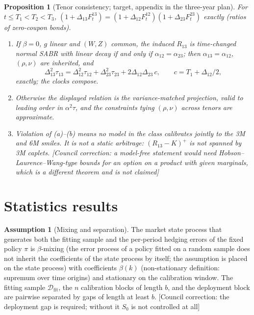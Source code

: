 \documentclass[11pt,a4paper]{article}
\newcommand{\corr}[1]{{\color{ox}\textsf{\small [Council correction: #1]}}}
\newcommand{\target}{{\color{teal}\textsf{\small target}}}
\theoremstyle{plain}
\newtheorem{proposition}[theorem]{Proposition}
\theoremstyle{definition}
\newtheorem{assumption}{Assumption}
\theoremstyle{remark}
\begin{document}
\begin{proposition}[Tenor consistency; \target, appendix in the three-year plan]\label{prop:tenor}
For $t\le T_1<T_2<T_3$, $(1+\Delta_{13}F^{13}_t)=(1+\Delta_{12}F^{12}_t)(1+\Delta_{23}F^{23}_t)$ exactly (ratios of zero-coupon bonds).
\begin{enumerate}[nosep,label=(\alph*)]
\item If $\beta=0$, $g$ linear and $(W,Z)$ common, the induced $R_{13}$ is time-changed normal SABR with linear decay if and only if $\alpha_{12}=\alpha_{23}$; then $\alpha_{13}=\alpha_{12}$, $(\rho,\nu)$ are inherited, and
\[
\Delta_{13}^2\tau_{13}=\Delta_{12}^2\tau_{12}+\Delta_{23}^2\tau_{23}+2\Delta_{12}\Delta_{23}\,c,\qquad c=T_1+\Delta_{12}/2,
\]
exactly; the clocks compose.
\item Otherwise the displayed relation is the variance-matched projection, valid to leading order in $\alpha^2\tau$, and the constraints tying $(\rho,\nu)$ across tenors are approximate.
\item Violation of (a)--(b) means no model in the class calibrates jointly to the 3M and 6M smiles. It is \emph{not} a static arbitrage: $(R_{13}-K)^+$ is not spanned by 3M caplets. \corr{a model-free statement would need Hobson--Laurence--Wang-type bounds for an option on a product with given marginals, which is a different theorem and is not claimed}
\end{enumerate}
\end{proposition}

\section{Statistics results}

\begin{assumption}[Mixing and separation]\label{ass:mix}
The market state process that generates both the fitting sample and the per-period hedging errors of the fixed policy $\pi$ is $\beta$-mixing (the error process of a policy fitted on a random sample does not inherit the coefficients of the state process by itself; the assumption is placed on the state process) with coefficients $\beta(k)$ (non-stationary definition: supremum over time origins) and stationary on the calibration window. The fitting sample $\mathcal D_{\mathrm{fit}}$, the $n$ calibration blocks of length $b$, and the deployment block are pairwise separated by gaps of length at least $b$. \corr{the deployment gap is required; without it $S_0$ is not controlled at all}
\end{assumption}
\end{document}
